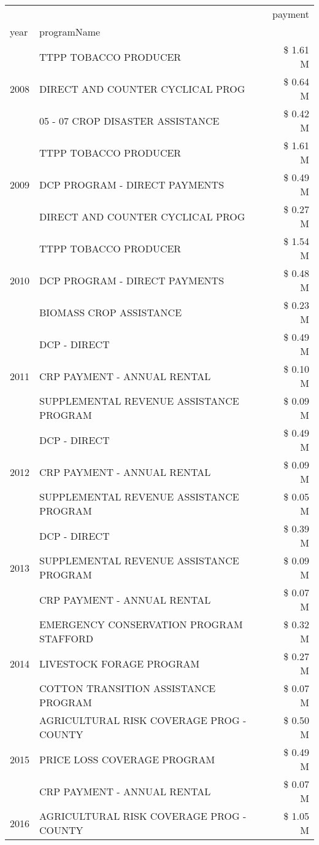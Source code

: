 \begin{tabular}{llr}
\toprule
 &  & payment \\
year & programName &  \\
\midrule
\multirow[t]{3}{*}{2008} & TTPP TOBACCO PRODUCER & \$ 1.61 M \\
 & DIRECT AND COUNTER CYCLICAL PROG & \$ 0.64 M \\
 & 05 - 07 CROP DISASTER ASSISTANCE & \$ 0.42 M \\
\cline{1-3}
\multirow[t]{3}{*}{2009} & TTPP TOBACCO PRODUCER & \$ 1.61 M \\
 & DCP PROGRAM - DIRECT PAYMENTS & \$ 0.49 M \\
 & DIRECT AND COUNTER CYCLICAL PROG & \$ 0.27 M \\
\cline{1-3}
\multirow[t]{3}{*}{2010} & TTPP TOBACCO PRODUCER & \$ 1.54 M \\
 & DCP PROGRAM - DIRECT PAYMENTS & \$ 0.48 M \\
 & BIOMASS CROP ASSISTANCE & \$ 0.23 M \\
\cline{1-3}
\multirow[t]{3}{*}{2011} & DCP - DIRECT & \$ 0.49 M \\
 & CRP PAYMENT - ANNUAL RENTAL & \$ 0.10 M \\
 & SUPPLEMENTAL REVENUE ASSISTANCE PROGRAM & \$ 0.09 M \\
\cline{1-3}
\multirow[t]{3}{*}{2012} & DCP - DIRECT & \$ 0.49 M \\
 & CRP PAYMENT - ANNUAL RENTAL & \$ 0.09 M \\
 & SUPPLEMENTAL REVENUE ASSISTANCE PROGRAM & \$ 0.05 M \\
\cline{1-3}
\multirow[t]{3}{*}{2013} & DCP - DIRECT & \$ 0.39 M \\
 & SUPPLEMENTAL REVENUE ASSISTANCE PROGRAM & \$ 0.09 M \\
 & CRP PAYMENT - ANNUAL RENTAL & \$ 0.07 M \\
\cline{1-3}
\multirow[t]{3}{*}{2014} & EMERGENCY CONSERVATION PROGRAM STAFFORD & \$ 0.32 M \\
 & LIVESTOCK FORAGE PROGRAM & \$ 0.27 M \\
 & COTTON TRANSITION ASSISTANCE PROGRAM & \$ 0.07 M \\
\cline{1-3}
\multirow[t]{3}{*}{2015} & AGRICULTURAL RISK COVERAGE PROG - COUNTY & \$ 0.50 M \\
 & PRICE LOSS COVERAGE PROGRAM & \$ 0.49 M \\
 & CRP PAYMENT - ANNUAL RENTAL & \$ 0.07 M \\
\cline{1-3}
\multirow[t]{3}{*}{2016} & AGRICULTURAL RISK COVERAGE PROG - COUNTY & \$ 1.05 M \\

\end{tabular}
